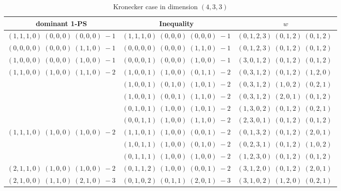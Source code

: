 \documentclass[11pt]{article}
\begin{document}
 
 \begin{longtable}[l]{|c|c|c|} 
 \caption{Kronecker case in dimension $(4,3,3)$} \\  
 
 \hline 
 \textrm{dominant 1-PS} & \textrm{Inequality} & $w$ \\ 
 \hline\multirow[t]{1}{*}{ $(1 ,1 ,1 ,0) \;(0 ,0 ,0) \;(0 ,0 ,0) \;-1$ }  & $(1 ,1 ,1 ,0) \;(0 ,0 ,0) \;(0 ,0 ,0) \;-1$ & $(0 ,1 ,2 ,3) \;(0 ,1 ,2) \;(0 ,1 ,2) \;$\\ \hline\multirow[t]{1}{*}{ $(0 ,0 ,0 ,0) \;(0 ,0 ,0) \;(1 ,1 ,0) \;-1$ }  & $(0 ,0 ,0 ,0) \;(0 ,0 ,0) \;(1 ,1 ,0) \;-1$ & $(0 ,1 ,2 ,3) \;(0 ,1 ,2) \;(0 ,1 ,2) \;$\\ \hline\multirow[t]{1}{*}{ $(1 ,0 ,0 ,0) \;(0 ,0 ,0) \;(1 ,0 ,0) \;-1$ }  & $(0 ,0 ,0 ,1) \;(0 ,0 ,0) \;(1 ,0 ,0) \;-1$ & $(3 ,0 ,1 ,2) \;(0 ,1 ,2) \;(0 ,1 ,2) \;$\\ \hline\multirow[t]{5}{*}{ $(1 ,1 ,0 ,0) \;(1 ,0 ,0) \;(1 ,1 ,0) \;-2$ }  & $(1 ,0 ,0 ,1) \;(1 ,0 ,0) \;(0 ,1 ,1) \;-2$ & $(0 ,3 ,1 ,2) \;(0 ,1 ,2) \;(1 ,2 ,0) \;$\\ 
 \cline{2-3} 
 & $(1 ,0 ,0 ,1) \;(0 ,1 ,0) \;(1 ,0 ,1) \;-2$ & $(0 ,3 ,1 ,2) \;(1 ,0 ,2) \;(0 ,2 ,1) \;$\\ 
 \cline{2-3} 
 & $(1 ,0 ,0 ,1) \;(0 ,0 ,1) \;(1 ,1 ,0) \;-2$ & $(0 ,3 ,1 ,2) \;(2 ,0 ,1) \;(0 ,1 ,2) \;$\\ 
 \cline{2-3} 
 & $(0 ,1 ,0 ,1) \;(1 ,0 ,0) \;(1 ,0 ,1) \;-2$ & $(1 ,3 ,0 ,2) \;(0 ,1 ,2) \;(0 ,2 ,1) \;$\\ 
 \cline{2-3} 
 & $(0 ,0 ,1 ,1) \;(1 ,0 ,0) \;(1 ,1 ,0) \;-2$ & $(2 ,3 ,0 ,1) \;(0 ,1 ,2) \;(0 ,1 ,2) \;$\\ \hline\multirow[t]{3}{*}{ $(1 ,1 ,1 ,0) \;(1 ,0 ,0) \;(1 ,0 ,0) \;-2$ }  & $(1 ,1 ,0 ,1) \;(1 ,0 ,0) \;(0 ,0 ,1) \;-2$ & $(0 ,1 ,3 ,2) \;(0 ,1 ,2) \;(2 ,0 ,1) \;$\\ 
 \cline{2-3} 
 & $(1 ,0 ,1 ,1) \;(1 ,0 ,0) \;(0 ,1 ,0) \;-2$ & $(0 ,2 ,3 ,1) \;(0 ,1 ,2) \;(1 ,0 ,2) \;$\\ 
 \cline{2-3} 
 & $(0 ,1 ,1 ,1) \;(1 ,0 ,0) \;(1 ,0 ,0) \;-2$ & $(1 ,2 ,3 ,0) \;(0 ,1 ,2) \;(0 ,1 ,2) \;$\\ \hline\multirow[t]{1}{*}{ $(2 ,1 ,1 ,0) \;(1 ,0 ,0) \;(1 ,0 ,0) \;-2$ }  & $(0 ,1 ,1 ,2) \;(1 ,0 ,0) \;(0 ,0 ,1) \;-2$ & $(3 ,1 ,2 ,0) \;(0 ,1 ,2) \;(2 ,0 ,1) \;$\\ \hline\multirow[t]{3}{*}{ $(2 ,1 ,0 ,0) \;(1 ,1 ,0) \;(2 ,1 ,0) \;-3$ }  & $(0 ,1 ,0 ,2) \;(0 ,1 ,1) \;(2 ,0 ,1) \;-3$ & $(3 ,1 ,0 ,2) \;(1 ,2 ,0) \;(0 ,2 ,1) \;$\\ 

\end{longtable}
\end{document}
